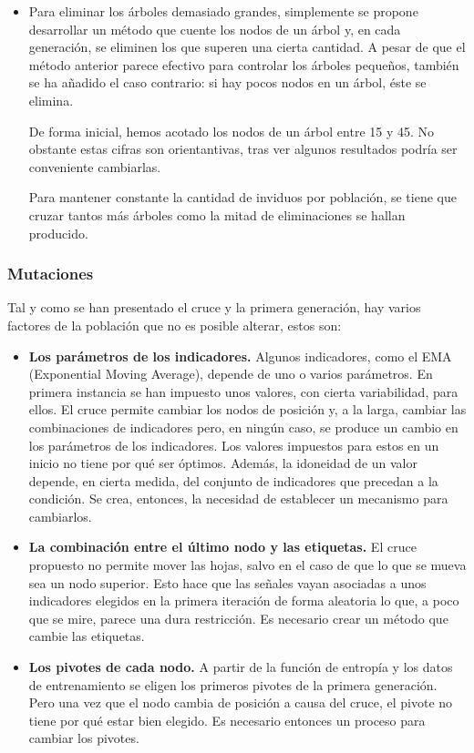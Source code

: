 \begin{itemize}
    \item Para eliminar los \'arboles demasiado grandes, simplemente se propone desarrollar un m\'etodo que cuente los nodos de un \'arbol y, en cada generaci\'on, se eliminen los que superen una cierta cantidad. A pesar de que el m\'etodo anterior parece efectivo para controlar los \'arboles peque\~nos, tambi\'en se ha a\~nadido el caso contrario: si hay pocos nodos en un \'arbol, \'este se elimina. 
    
    De forma inicial, hemos acotado los nodos de un \'arbol entre 15 y 45. No obstante estas cifras son orientantivas, tras ver algunos resultados podr\'ia ser conveniente cambiarlas.
    
    Para mantener constante la cantidad de inviduos por poblaci\'on, se tiene que cruzar tantos m\'as \'arboles como la mitad de eliminaciones se hallan producido.
\end{itemize}{}

\subsubsection{Mutaciones}
Tal y como se han presentado el cruce y la primera generaci\'on, hay varios factores de la poblaci\'on que no es posible alterar, estos son:

\begin{itemize}
    \item \textbf{Los par\'ametros de los indicadores.} Algunos indicadores, como el EMA (Exponential Moving Average), depende de uno o varios par\'ametros. En primera instancia se han impuesto unos valores, con cierta variabilidad, para ellos. El cruce permite cambiar los nodos de posici\'on y, a la larga, cambiar las combinaciones de indicadores pero, en ning\'un caso, se produce un cambio en los par\'ametros de los indicadores. Los valores impuestos para estos en un inicio no tiene por qu\'e ser \'optimos. Adem\'as, la idoneidad de un valor depende, en cierta medida, del conjunto de indicadores que precedan a la condici\'on. Se crea, entonces, la necesidad de establecer un mecanismo para cambiarlos.
    \item \textbf{La combinaci\'on entre el \'ultimo nodo y las etiquetas.} El cruce propuesto no permite mover las hojas, salvo en el caso de que lo que se mueva sea un nodo superior. Esto hace que las se\~nales vayan asociadas a unos indicadores elegidos en la primera iteraci\'on de forma aleatoria lo que, a poco que se mire, parece una dura restricci\'on. Es necesario crear un m\'etodo que cambie las etiquetas. 
    \item \textbf{Los pivotes de cada nodo.} A partir de la funci\'on de entrop\'ia y los datos de entrenamiento se eligen los primeros pivotes de la primera generaci\'on. Pero una vez que el nodo cambia de posici\'on a causa del cruce, el pivote no tiene por qu\'e estar bien elegido. Es necesario entonces un proceso para cambiar los pivotes.
\end{itemize}


